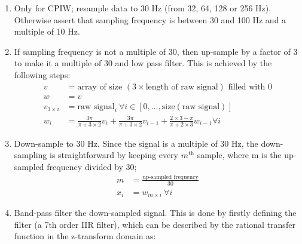 \documentclass{bmcart}
\begin{document}
\begin{enumerate}

	\item{Only for CPIW; resample data to 30 Hz (from 32, 64, 128 or 256
	            Hz). Otherwise assert that sampling frequency is between 30 and 100 Hz and a
	            multiple of 10 Hz.}
	\item{If sampling frequency is not a multiple of 30, then up-sample by
	            a factor of 3 to make it a multiple of 30 and low pass filter. This is achieved
	            by the following steps:
	            \begin{align*}
		            v       & = \textrm{array of size } (3 \times
		            \textrm{length of raw signal}) \textrm{ filled with } 0 \\
		            w       & = v
		            \\
		            v_{3\times i} & = \textrm{raw signal}_i ~\forall i\in
		            \left[ 0, \ldots, \textrm{size}(\textrm{raw signal})\right]            \\
		            w_i     & = \frac{3\pi}{\pi+3\times2}
		            v_i+\frac{3\pi}{\pi+3\times2}v_{i-1} +\frac{2\times3-\pi}{\pi+2\times3}w_{i-1} \forall i
	            \end{align*}
	      }
	\item{Down-sample to 30 Hz. Since the signal is a multiple of 30 Hz,
	            the down-sampling is straightforward by keeping every $m^\textrm{th}$ sample,
	            where m is the up-sampled frequency divided by 30;
	            \begin{align*}
		            m   & = \frac{\textrm{up-sampled frequency}}{30} \\
		            x_i & = w_{m\times i}~\forall i
	            \end{align*}
	      }
	\item{
	Band-pass filter the down-sampled signal. This is done by firstly
	defining the filter (a 7th order IIR filter), which can be described by the
	rational transfer function in the z-transform domain as:

}
\end{enumerate}
\end{document}
